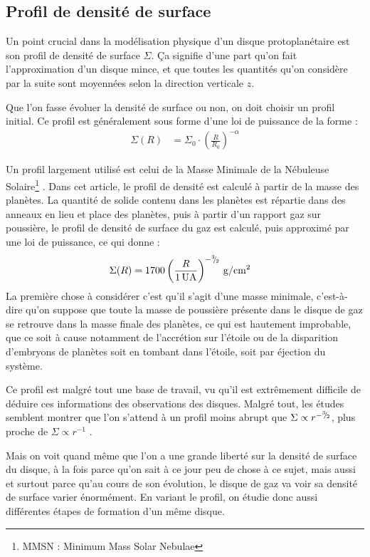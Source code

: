 \subsection{Profil de densité de surface}
Un point crucial dans la modélisation physique d'un disque protoplanétaire est son profil de densité de surface $\Sigma$. Ça signifie d'une part qu'on fait l'approximation d'un disque mince, et que toutes les quantités qu'on considère par la suite sont moyennées selon la direction verticale $z$.

Que l'on fasse évoluer la densité de surface ou non, on doit choisir un profil initial. Ce profil est généralement sous forme d'une loi de puissance de la forme : 
\begin{align}
\Sigma(R) &= \Sigma_0 \cdot \left(\frac{R}{R_0}\right)^{-\alpha}
\end{align}

Un profil largement utilisé est celui de la Masse Minimale de la Nébuleuse Solaire\footnote{MMSN : Minimum Mass Solar Nebulae} \citep{weidenschilling1977distribution, hayashi1981structure}. Dans cet article, le profil de densité est calculé à partir de la masse des planètes. La quantité de solide contenu dans les planètes est répartie dans des anneaux en lieu et place des planètes, puis à partir d'un rapport gaz sur poussière, le profil de densité de surface du gaz est calculé, puis approximé par une loi de puissance, ce qui donne : 
\begin{align}
\Sigma(R) &= 1700 \left(\frac{R}{1\mathrm{\thinspace UA}}\right)^{-{{}^{3\!\!}/ _{\!2}}} \mathrm{\thinspace g/cm^2}
\end{align}
La première chose à considérer c'est qu'il s'agit d'une masse minimale, c'est-à-dire qu'on suppose que toute
la masse de poussière présente dans le disque de gaz se retrouve dans la masse finale des planètes, ce qui est hautement
improbable, que ce soit à cause notamment de l'accrétion sur l'étoile ou de la disparition d'embryons de planètes soit en
tombant dans l'étoile, soit par éjection du système.

Ce profil est malgré tout une base de travail, vu qu'il est extrêmement difficile de déduire ces informations des observations des disques. Malgré tout, les études semblent montrer que l'on s'attend à un profil moins abrupt que $\Sigma\propto r^{-{{}^{3\!\!}/ _{\!2}}}$, plus proche de $\Sigma\propto r^{-1}$ \citep{bell1997structure}.

Mais on voit quand même que l'on a une grande liberté sur la densité de surface du disque, à la fois parce qu'on sait à ce jour peu de chose à ce sujet, mais aussi et surtout parce qu'au cours de son évolution, le disque de gaz va voir sa densité de surface varier énormément. En variant le profil, on étudie donc aussi différentes étapes de formation d'un même disque. 

